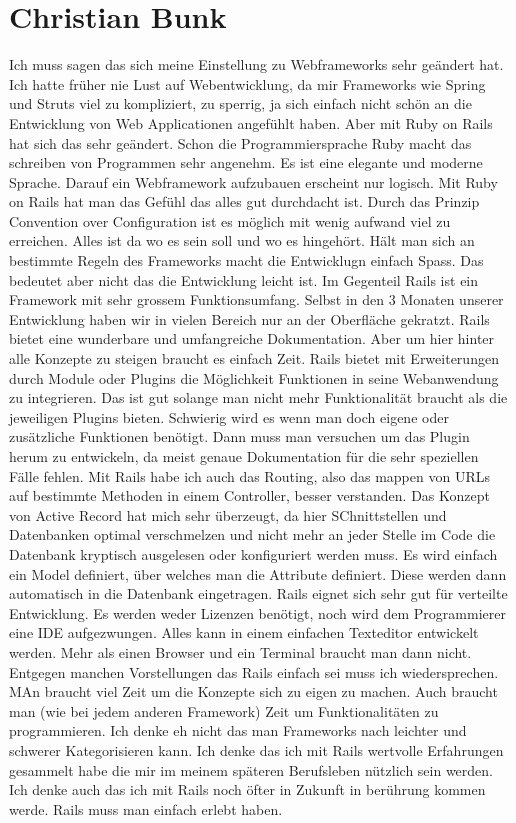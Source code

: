 \section{Christian Bunk}
Ich muss sagen das sich meine Einstellung zu Webframeworks sehr geändert hat. Ich hatte früher nie Lust auf Webentwicklung, da mir Frameworks wie Spring und Struts viel zu kompliziert, zu sperrig, ja sich einfach nicht schön an die Entwicklung von Web Applicationen angefühlt haben. Aber mit Ruby on Rails hat sich das sehr geändert. Schon die Programmiersprache Ruby macht das schreiben von Programmen sehr angenehm. Es ist eine elegante und moderne Sprache. Darauf ein Webframework aufzubauen erscheint nur logisch. Mit Ruby on Rails hat man das Gefühl das alles gut durchdacht ist. Durch das Prinzip Convention over Configuration ist es möglich mit wenig aufwand viel zu erreichen. Alles ist da wo es sein soll und wo es hingehört. Hält man sich an bestimmte Regeln des Frameworks macht die Entwicklugn einfach Spass. Das bedeutet aber nicht das die Entwicklung leicht ist. Im Gegenteil Rails ist ein Framework mit sehr grossem Funktionsumfang. Selbst in den 3 Monaten unserer Entwicklung haben wir in vielen Bereich nur an der Oberfläche gekratzt. Rails bietet eine wunderbare und umfangreiche Dokumentation. Aber um hier hinter alle Konzepte zu steigen braucht es einfach Zeit. Rails bietet mit Erweiterungen durch Module oder Plugins die Möglichkeit Funktionen in seine Webanwendung zu integrieren. Das ist gut solange man nicht mehr Funktionalität braucht als die jeweiligen Plugins bieten. Schwierig wird es wenn man doch eigene oder zusätzliche Funktionen benötigt. Dann muss man versuchen um das Plugin herum zu entwickeln, da meist genaue Dokumentation für die sehr speziellen Fälle fehlen. Mit Rails habe ich auch das Routing, also das mappen von URLs auf bestimmte Methoden in einem Controller, besser verstanden. Das Konzept von Active Record hat mich sehr überzeugt, da hier SChnittstellen und Datenbanken optimal verschmelzen und nicht mehr an jeder Stelle im Code die Datenbank kryptisch ausgelesen oder konfiguriert werden muss. Es wird einfach ein Model definiert, über welches man die Attribute definiert. Diese werden dann automatisch in die Datenbank eingetragen. Rails eignet sich sehr gut für verteilte Entwicklung. Es werden weder Lizenzen benötigt, noch wird dem Programmierer eine IDE aufgezwungen. Alles kann in einem einfachen Texteditor entwickelt werden. Mehr als einen Browser und ein Terminal braucht man dann nicht. Entgegen manchen Vorstellungen das Rails einfach sei muss ich wiedersprechen. MAn braucht viel Zeit um die Konzepte sich zu eigen zu machen. Auch braucht man (wie bei jedem anderen Framework) Zeit um Funktionalitäten zu programmieren. Ich denke eh nicht das man Frameworks nach leichter und schwerer Kategorisieren kann. Ich denke das ich mit Rails wertvolle Erfahrungen gesammelt habe die mir im meinem späteren Berufsleben nützlich sein werden. Ich denke auch das ich mit Rails noch öfter in Zukunft in berührung kommen werde. Rails muss man einfach erlebt haben.